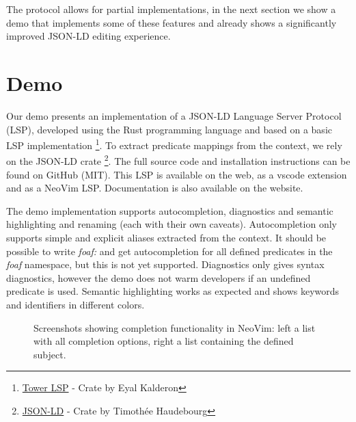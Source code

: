 \documentclass[
]{ceurart}
\begin{document}
The protocol allows for partial implementations, in the next section we show a demo that implements some of these features and already shows a significantly improved JSON-LD editing experience.


\section{Demo}

Our demo presents an implementation of a JSON-LD Language Server Protocol (LSP), developed using the Rust programming language and based on a basic LSP implementation \footnote{\href{https://crates.io/crates/tower-lsp}{Tower LSP} - Crate by Eyal Kalderon}.
To extract predicate mappings from the context, we rely on the JSON-LD crate \footnote{\href{https://crates.io/crates/json-ld}{JSON-LD} - Crate by Timothée Haudebourg}.
The full source code and installation instructions can be found on GitHub (MIT).
This LSP is available on the web, as a vscode extension and as a NeoVim LSP. Documentation is also available on the website. 

The demo implementation supports autocompletion, diagnostics and semantic highlighting and renaming (each with their own caveats). 
Autocompletion only supports simple and explicit aliases extracted from the context. 
It should be possible to write \textit{foaf:} and get autocompletion for all defined predicates in the \textit{foaf} namespace, but this is not yet supported.
Diagnostics only gives syntax diagnostics, however the demo does not warm developers if an undefined predicate is used.
Semantic highlighting works as expected and shows keywords and identifiers in different colors.


\begin{figure}
\centering
{}
\caption{Screenshots showing completion functionality in NeoVim: left a list with all completion options, right a list containing the defined subject.}
\label{fig:complete}
\end{figure}
\end{document}
